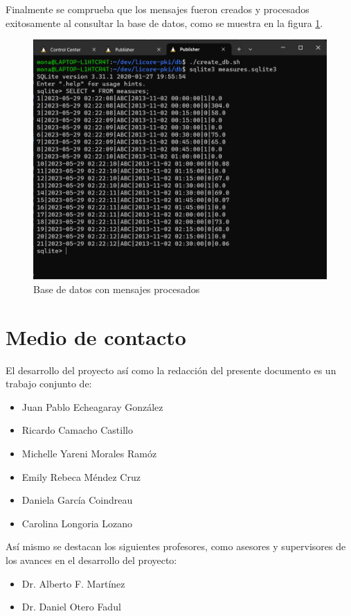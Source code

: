 \documentclass{article}
\begin{document}
        Finalmente se comprueba que los mensajes fueron creados y procesados exitosamente al consultar la base de datos, como se muestra en la figura \ref{fig:db}.
        \begin{figure}[!htbp]
            \centering
            \includegraphics[scale=0.5]{database.png}
            \caption{Base de datos con mensajes procesados}
            \label{fig:db}
        \end{figure}

    \section{Medio de contacto}\label{sec:contact}

        El desarrollo del proyecto así como la redacción del presente documento es un trabajo conjunto de:
        \begin{itemize}[noitemsep]
            \item Juan Pablo Echeagaray González
            \item Ricardo Camacho Castillo
            \item Michelle Yareni Morales Ramóz
            \item Emily Rebeca Méndez Cruz
            \item Daniela García Coindreau
            \item Carolina Longoria Lozano
        \end{itemize}

        Así mismo se destacan los siguientes profesores, como asesores y supervisores de los avances en el desarrollo del proyecto:
        \begin{itemize}[noitemsep]
            \item Dr. Alberto F. Martínez
            \item Dr. Daniel Otero Fadul
        \end{itemize}
\end{document}
